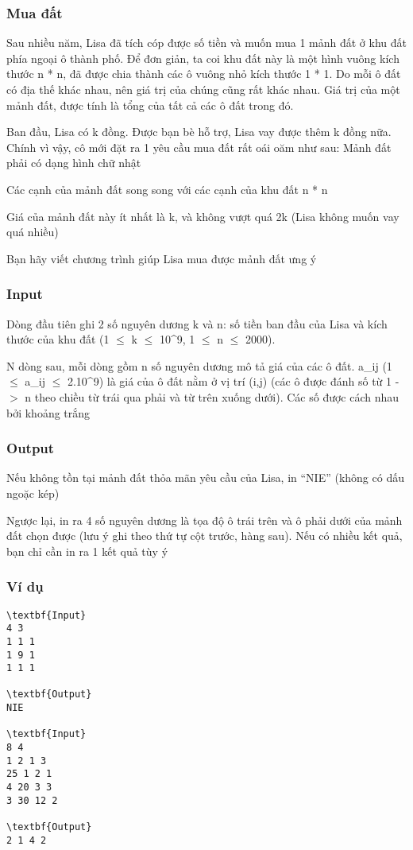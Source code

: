 



\subsubsection{   Mua đất  }

   Sau nhiều năm, Lisa đã tích cóp được số tiền và muốn mua 1 mảnh đất ở khu đất phía ngoại ô thành phố. Để đơn giản, ta coi khu đất này là một hình vuông kích thước n * n, đã được chia thành các ô vuông nhỏ kích thước 1 * 1. Do mỗi ô đất có địa thế khác nhau, nên giá trị của chúng cũng rất khác nhau. Giá trị của một mảnh đất, được tính là tổng của tất cả các ô đất trong đó.  

   Ban đầu, Lisa có k đồng. Được bạn bè hỗ trợ, Lisa vay được thêm k đồng nữa. Chính vì vậy, cô mới đặt ra 1 yêu cầu mua đất rất oái oăm như sau: Mảnh đất phải có dạng hình chữ nhật  

   Các cạnh của mảnh đất song song với các cạnh của khu đất n * n  

   Giá của mảnh đất này ít nhất là k, và không vượt quá 2k (Lisa không muốn vay quá nhiều)  

   Bạn hãy viết chương trình giúp Lisa mua được mảnh đất ưng ý  

\subsubsection{   Input  }

   Dòng đầu tiên ghi 2 số nguyên dương k và n: số tiền ban đầu của Lisa và kích thước của khu đất (1  $\le$  k  $\le$  10\textasciicircum9, 1  $\le$  n  $\le$  2000).  

   N dòng sau, mỗi dòng gồm n số nguyên dương mô tả giá của các ô đất. a\_ij (1  $\le$  a­\_ij  $\le$  2.10\textasciicircum9) là giá của ô đất nằm ở vị trí (i,j) (các ô được đánh số từ 1 -$>$ n theo chiều từ trái qua phải và từ trên xuống dưới). Các số được cách nhau bởi khoảng trắng  

\subsubsection{   Output  }

   Nếu không tồn tại mảnh đất thỏa mãn yêu cầu của Lisa, in “NIE” (không có dấu ngoặc kép)  

   Ngược lại, in ra 4 số nguyên dương là tọa độ ô trái trên và ô phải dưới của mảnh đất chọn được (lưu ý ghi theo thứ tự cột trước, hàng sau). Nếu có nhiều kết quả, bạn chỉ cần in ra 1 kết quả tùy ý  

\subsubsection{   Ví dụ  }
\begin{verbatim}
\textbf{Input}
4 3
1 1 1
1 9 1
1 1 1

\textbf{Output}
NIE

\textbf{Input}
8 4
1 2 1 3
25 1 2 1
4 20 3 3
3 30 12 2

\textbf{Output}
2 1 4 2
\end{verbatim}
